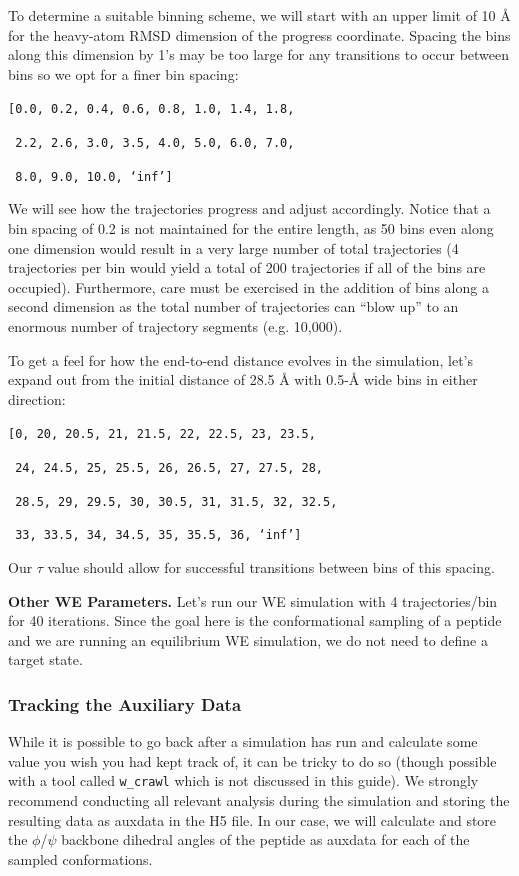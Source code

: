 \documentclass[9pt,tutorial,pubversion]{livecoms}
\begin{document}
To determine a suitable binning scheme, we will start with an upper limit of 10 \AA{} for the heavy-atom RMSD dimension of the progress coordinate. 
Spacing the bins along this dimension by 1’s may be too large for any transitions to occur between bins so we opt for a finer bin spacing:

\verb|[0.0, 0.2, 0.4, 0.6, 0.8, 1.0, 1.4, 1.8,|

\verb| 2.2, 2.6, 3.0, 3.5, 4.0, 5.0, 6.0, 7.0,|

\verb| 8.0, 9.0, 10.0, ‘inf’]|

We will see how the trajectories progress and adjust accordingly. 
Notice that a bin spacing of 0.2 is not maintained for the entire length, as 50 bins even along one dimension would result in a very large number of total trajectories (4 trajectories per bin would yield a total of 200 trajectories if all of the bins are occupied). 
Furthermore, care must be exercised in the addition of bins along a second dimension as the total number of trajectories can “blow up” to an enormous number of trajectory segments (e.g. 10,000).

To get a feel for how the end-to-end distance evolves in the simulation, let’s expand out from the initial distance of 28.5 \AA{} with 0.5-\AA{} wide bins in either direction:

\verb|[0, 20, 20.5, 21, 21.5, 22, 22.5, 23, 23.5,|

\verb| 24, 24.5, 25, 25.5, 26, 26.5, 27, 27.5, 28,|

\verb| 28.5, 29, 29.5, 30, 30.5, 31, 31.5, 32, 32.5,|

\verb| 33, 33.5, 34, 34.5, 35, 35.5, 36, ‘inf’]|

Our $\tau$ value should allow for successful transitions between bins of this spacing.

\textbf{Other WE Parameters.} Let’s run our WE simulation with 4 trajectories/bin for 40 iterations. 
Since the goal here is the conformational sampling of a peptide and we are running an equilibrium WE simulation, we do not need to define a target state.

\subsubsection{Tracking the Auxiliary Data}

While it is possible to go back after a simulation has run and calculate some value you wish you had kept track of, it can be tricky to do so (though possible with a tool called \verb|w_crawl| which is not discussed in this guide). 
We strongly recommend conducting all relevant analysis during the simulation and storing the resulting data as auxdata in the H5 file. 
In our case, we will  calculate and store the $\phi$/$\psi$ backbone dihedral angles of the peptide as auxdata for each of the sampled conformations.  
\end{document}
